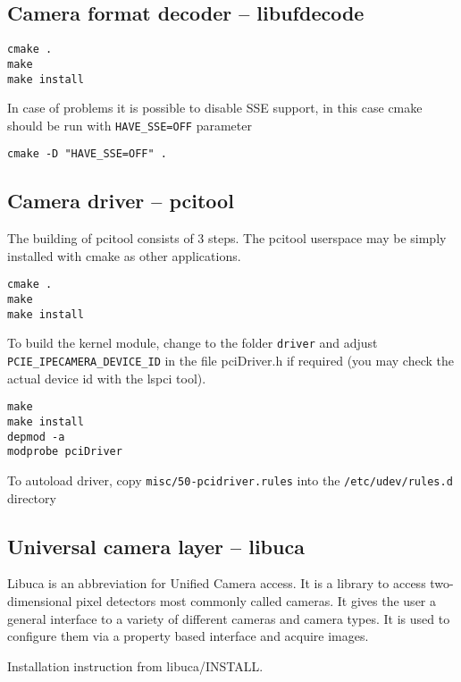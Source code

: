 \subsection{Camera format decoder -- libufdecode}
\begin{verbatim}
cmake .
make 
make install
\end{verbatim}

In case of problems it is possible to disable SSE support, in this case cmake should be run with \verb/HAVE_SSE=OFF/ parameter
\begin{verbatim}
cmake -D "HAVE_SSE=OFF" .
\end{verbatim}


\subsection{Camera driver -- pcitool}
The building of pcitool consists of 3 steps. The pcitool userspace may be simply installed with cmake as other applications.
\begin{verbatim}
cmake .
make
make install
\end{verbatim}

To build the kernel module, change to the folder \verb/driver/ and adjust
\verb/PCIE_IPECAMERA_DEVICE_ID/ in the file pciDriver.h if required (you may
check the actual device id with the lspci tool).
\begin{verbatim}
make
make install
depmod -a
modprobe pciDriver
\end{verbatim}
To autoload driver, copy \verb|misc/50-pcidriver.rules| into the \verb|/etc/udev/rules.d| directory



\subsection{Universal camera layer -- libuca}

Libuca is an abbreviation for Unified Camera access. It is a library to access two-dimensional pixel detectors most commonly called cameras. It gives the user a general interface to a variety of different cameras and camera types. It is used to configure them via a property based
interface and acquire images.

Installation instruction from libuca/INSTALL.

